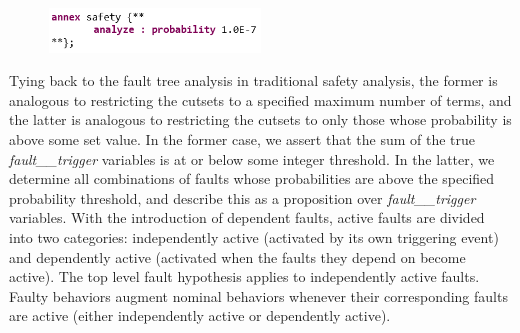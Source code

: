 \begin{figure}[h!]
	\vspace{-0.1in}
		\includegraphics[width=0.5\textwidth]{images/hypothesisProb.png}
	\vspace{-0.1in}
\end{figure}

Tying back to the fault tree analysis in traditional safety analysis, the former is analogous to restricting the cutsets to a specified maximum number of terms, and the latter is analogous to restricting the cutsets to only those whose probability is above some set value. In the former case, we assert that the sum of the true {\em fault\_\_trigger} variables is at or below some integer threshold.  In the latter, we determine all combinations of faults whose probabilities are above the specified probability threshold, and describe this as a proposition over {\em fault\_\_trigger} variables. 
%
With the introduction of dependent faults, active faults are divided into two categories: independently active (activated by its own triggering event) and dependently active (activated when the faults they depend on become active). The top level fault hypothesis applies to independently active faults. Faulty behaviors augment nominal behaviors whenever their corresponding faults are active (either independently active or dependently active).









